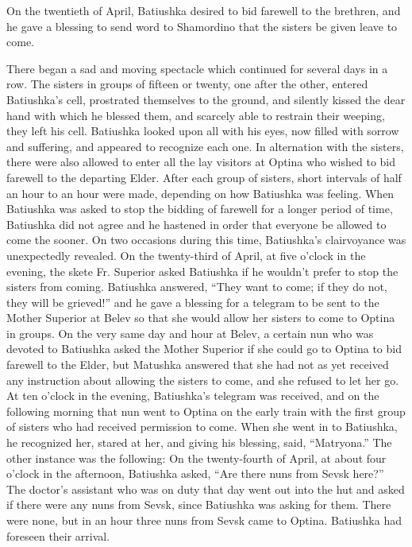 On the twentieth of April, Batiushka desired to bid farewell to the brethren, and he gave a blessing to send word to Shamordino that the sisters be given leave to come.

There began a sad and moving spectacle which continued for several days in a row. The sisters in groups of fifteen or twenty, one after the other, entered Batiushka's cell, prostrated themselves to the ground, and silently kissed the dear hand with which he blessed them, and scarcely able to restrain their weeping, they left his cell. Batiushka looked upon all with his eyes, now filled with sorrow and suffering, and appeared to recognize each one. In alternation with the sisters, there were also allowed to enter all the lay visitors at Optina who wished to bid farewell to the departing Elder. After each group of sisters, short intervals of half an hour to an hour were made, depending on how Batiushka was feeling. When Batiushka was asked to stop the bidding of farewell for a longer period of time, Batiushka did not agree and he hastened in order that everyone be allowed to come the sooner. On two occasions during this time, Batiushka's clairvoyance was unexpectedly revealed. On the twenty-third of April, at five o'clock in the evening, the skete Fr. Superior asked Batiushka if he wouldn't prefer to stop the sisters from coming. Batiushka answered, “They want to come; if they do not, they will be grieved!” and he gave a blessing for a telegram to be sent to the Mother Superior at Belev so that she would allow her sisters to come to Optina in groups. On the very same day and hour at Belev, a certain nun who was devoted to Batiushka asked the Mother Superior if she could go to Optina to bid farewell to the Elder, but Matushka answered that she had not as yet received any instruction about allowing the sisters to come, and she refused to let her go. At ten o'clock in the evening, Batiushka's telegram was received, and on the following morning that nun went to Optina on the early train with the first group of sisters who had received permission to come. When she went in to Batiushka, he recognized her, stared at her, and giving his blessing, said, “Matryona.'' The other instance was the following: On the twenty-fourth of April, at about four o'clock in the afternoon, Batiushka asked, “Are there nuns from Sevsk here?” The doctor's assistant who was on duty that day went out into the hut and asked if there were any nuns from Sevsk, since Batiushka was asking for them. There were none, but in an hour three nuns from Sevsk came to Optina. Batiushka had foreseen their arrival.

